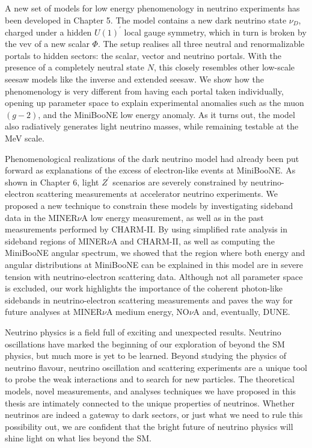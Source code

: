 A new set of models for low energy phenomenology in neutrino experiments has been developed in Chapter 5. The model contains a new dark neutrino state $\nu_D$, charged under a hidden $U(1)^\prime$ local gauge symmetry, which in turn is broken by the vev of a new scalar $\Phi$. The setup realises all three neutral and renormalizable portals to hidden sectors: the scalar, vector and neutrino portals. With the presence of a completely neutral state $N$, this closely resembles other low-scale seesaw models like the inverse and extended seesaw. We show how the phenomenology is very different from having each portal taken individually, opening up parameter space to explain experimental anomalies such as the muon $(g-2)$, and the MiniBooNE low energy anomaly. As it turns out, the model also radiatively generates light neutrino masses, while remaining testable at the MeV scale.  

Phenomenological realizations of the dark neutrino model had already been put forward as explanations of the excess of electron-like events at MiniBooNE. As shown in Chapter 6, light $Z^\prime$ scenarios are severely constrained by neutrino-electron scattering measurements at accelerator neutrino experiments. We proposed a new technique to constrain these models by investigating sideband data in the MINER$\nu$A low energy measurement, as well as in the past measurements performed by CHARM-II. By using simplified rate analysis in sideband regions of MINER$\nu$A and CHARM-II, as well as computing the MiniBooNE angular spectrum, we showed that the region where both energy and angular distributions at MiniBooNE can be explained in this model are in severe tension with neutrino-electron scattering data. Although not all parameter space is excluded, our work highlights the importance of the coherent photon-like sidebands in neutrino-electron scattering measurements and paves the way for future analyses at MINER$\nu$A medium energy, NO$\nu$A and, eventually, DUNE.

Neutrino physics is a field full of exciting and unexpected results. Neutrino oscillations have marked the beginning of our exploration of beyond the SM physics, but much more is yet to be learned. Beyond studying the physics of neutrino flavour, neutrino oscillation and scattering experiments are a unique tool to probe the weak interactions and to search for new particles. The theoretical models, novel measurements, and analyses techniques we have proposed in this thesis are intimately connected to the unique properties of neutrinos. Whether neutrinos are indeed a gateway to dark sectors, or just what we need to rule this possibility out, we are confident that the bright future of neutrino physics will shine light on what lies beyond the SM.